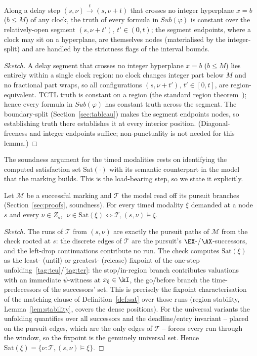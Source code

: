 \begin{lemma}\label{lem:stability}
Along a delay step $(s,\nu)\xrightarrow{t}(s,\nu+t)$ that crosses no integer hyperplane $x=b$ ($b\le M$) of any clock, the truth of every formula in $Sub(\varphi)$ is constant over the {relatively-open} segment $(s,\nu+t')$, $t'\in(0,t)$; the segment endpoints, where a clock may sit on a hyperplane, are themselves nodes (materialised by the integer-split) and are handled by the strictness flags of the interval bounds.
\end{lemma}
\begin{proof}[Sketch]
A delay segment that crosses no integer hyperplane $x=b$ ($b\le M$) lies entirely within a single clock {region}: no clock changes integer part below $M$ and no fractional part wraps, so all configurations $(s,\nu+t')$, $t'\in[0,t]$, are region-equivalent. TCTL truth is constant on a region (the standard region theorem~\cite{AlurCourcoubetisDill1990,Bouyer05TimedAutomata}); hence every formula in $Sub(\varphi)$ has constant truth across the segment. The boundary-split (Section~\ref{sec:tableau}) makes the segment endpoints nodes, so establishing truth there establishes it at every interior position. (Diagonal-freeness and integer endpoints suffice; non-punctuality is not needed for this lemma.)
\end{proof}

The soundness argument for the timed modalities rests on identifying the {computed} satisfaction set $\mathrm{Sat}(\cdot)$ with its {semantic} counterpart in the model that the marking builds. This is the load-bearing step, so we state it explicitly.

\begin{lemma}\label{lem:sat}
Let $\mathcal{M}$ be a successful marking and $\mathcal{T}$ the model read off its pursuit branches (Section~\ref{sec:proofs}, soundness). For every timed modality $\xi$ demanded at a node $s$ and every $\nu\in Z_s$, $\;\nu\in\mathrm{Sat}(\xi)\iff \mathcal{T},(s,\nu)\models\xi$.
\end{lemma}
\begin{proof}[Sketch]
The runs of $\mathcal{T}$ from $(s,\nu)$ are exactly the pursuit paths of $\mathcal{M}$ from the check rooted at $s$: the discrete edges of $\mathcal{T}$ are the pursuit's $\EX$-/$\AX$-successors, and the left-drop continuations contribute no run. The check computes $\mathrm{Sat}(\xi)$ as the least- (until) or greatest- (release) fixpoint of the one-step unfolding~\eqref{tag:teu}/\eqref{tag:ter}: the stop/in-region branch contributes valuations with an immediate $\psi$-witness at $x_\xi\in\kI$, the go/before branch the time-predecessors of the successors' set. This is precisely the fixpoint characterisation of the matching clause of Definition~\ref{def:sat} over those runs (region stability, Lemma~\ref{lem:stability}, covers the dense positions). For the universal variants the unfolding quantifies over {all} successors and the deadline/entry invariant -- placed on the pursuit edges, which are the {only} edges of $\mathcal{T}$ -- forces every run through the window, so the fixpoint is the genuinely universal set. Hence $\mathrm{Sat}(\xi)=\{\nu : \mathcal{T},(s,\nu)\models\xi\}$.
\end{proof}

